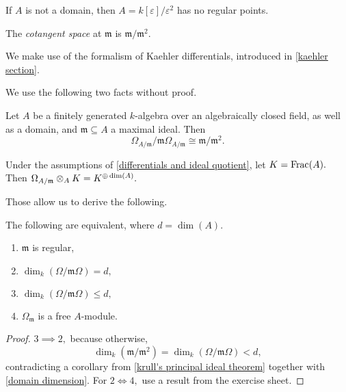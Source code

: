
\begin{example}
  If \(A\) is not a domain, then \(A = k[\varepsilon]/{\varepsilon^2}\) has no regular points.
\end{example}

\begin{df}
  The \emph{cotangent space} at \(\mathfrak m\) is \(\mathfrak m / {\mathfrak m^2}.\)
\end{df}

We make use of the formalism of Kaehler differentials, introduced in \cref{kaehler section}.

We use the following two facts without proof.

\begin{lemma}
  \label{differentials and ideal quotient}
  Let \(A\) be a finitely generated \(k\)-algebra over an algebraically closed field, as well as a domain, and \(\mathfrak m \subseteq A\) a maximal ideal. Then
  \[\Omega_{A/{\mathfrak{m}}} /{\mathfrak m \Omega_{A/{\mathfrak{m}}}} \cong \mathfrak m /{\mathfrak m^2}.\]
\end{lemma}

\begin{lemma}
  Under the assumptions of \cref{differentials and ideal quotient}, let \(K = \mathrm{Frac}(A).\) Then
  \(\Omega_{A/{\mathfrak{m}}} \otimes_A K = K^{\oplus \dim(A)}.\)
\end{lemma}

Those allow us to derive the following.

\begin{prop}
  \label{prop omega}
  The following are equivalent, where \(d = \dim(A).\)
  \begin{enumerate}
  \item \(\mathfrak m\) is regular,
  \item \(\dim_k(\Omega /{\mathfrak m \Omega}) = d,\)
  \item \(\dim_k(\Omega / {\mathfrak m \Omega}) \leq d,\)
  \item \(\Omega_{\mathfrak m}\) is a free \(A\)-module.
  \end{enumerate}
\end{prop}
\begin{proof}
  \(3 \implies 2,\) because otherwise,
  \[\dim_k(\mathfrak m /{\mathfrak m^2}) = \dim_k(\Omega / {\mathfrak m \Omega}) < d,\]
  contradicting a corollary from \cref{krull's principal ideal theorem} together with \cref{domain dimension}.
  For \(2 \iff 4,\) use a result from the exercise sheet.
\end{proof}

